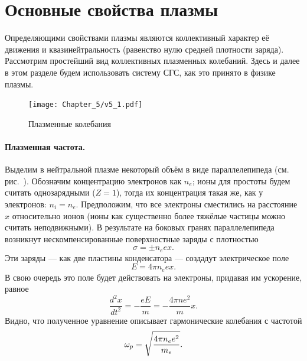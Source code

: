 \section{Основные свойства плазмы}
\label{sec:plasma}

Определяющими свойствами плазмы являются коллективный характер её движения
и квазинейтральность (равенство нулю средней плотности заряда).
Рассмотрим простейший вид коллективных плазменных колебаний. Здесь и далее
в этом разделе будем использовать систему СГС, как это принято в физике плазмы.

\begin{figure}
    \centering
    \texttt{[image: Chapter\_5/v5\_1.pdf]}
    \caption{Плазменные колебания}
\end{figure}

\paragraph{Плазменная частота.}
Выделим в нейтральной плазме некоторый объём в виде параллелепипеда
(см. рис.~).
Обозначим концентрацию электронов как $n_e$; ионы для простоты будем считать
однозарядными ($Z=1$), тогда их концентрация такая же, как у электронов: $n_i=n_e$.
Предположим, что все электроны сместились на расстояние $x$ относительно ионов
(ионы как существенно более тяжёлые частицы можно считать неподвижными).
В результате на боковых гранях параллелепипеда возникнут нескомпенсированные
поверхностные заряды с плотностью
\begin{equation*}
    \sigma = \pm n_e e x.
\end{equation*}
Эти заряды --- как две пластины конденсатора --- создадут электрическое поле
\begin{equation*}
    E=4\pi n_e e x.
\end{equation*}
В свою очередь это поле будет действовать на электроны,
придавая им ускорение, равное
\begin{equation*}
    \frac{d^2x}{dt^2}=-\frac{eE}{m}=-\frac{4\pi ne^2}{m}x.
\end{equation*}
Видно, что полученное уравнение описывает гармонические колебания с частотой
\begin{equation}
    \eqmark{plasma-freq}
    \omega_p=\sqrt{\frac{4\pi n_e e^2}{m_e}}.
\end{equation}

